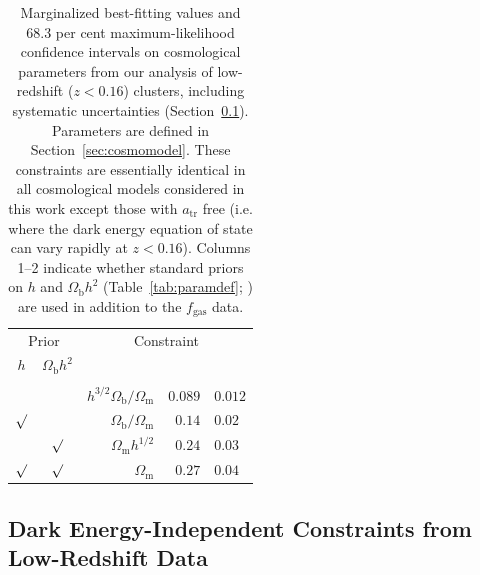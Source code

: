 \documentclass[useAMS,usenatbib,usegraphicx]{mn2e}
\newcommand*{\mysub}[2]{\ensuremath{#1_{\mathrm{#2}}}}
\newcommand*{\Omegam}{\mysub{\Omega}{m}}
\newcommand*{\Omegab}{\mysub{\Omega}{b}}
\newcommand*{\fgas}{\mysub{f}{gas}}
\newcommand*{\atr}{\mysub{a}{tr}}
\newcommand*{\secref}{Section}
\newcommand*{\tabref}{Table}
\begin{document}
\begin{table}
  \begin{center}
    \caption{
      Marginalized best-fitting values and 68.3 per cent maximum-likelihood confidence intervals on cosmological parameters from our analysis of low-redshift ($z<0.16$) clusters, including systematic uncertainties (\secref~\ref{sec:lowz}). Parameters are defined in \secref~\ref{sec:cosmomodel}. These constraints are essentially identical in all cosmological models considered in this work except those with $\atr$ free (i.e. where the dark energy equation of state can vary rapidly at $z<0.16$). Columns 1--2 indicate whether standard priors on $h$ and $\Omegab h^2$ (\tabref~\ref{tab:paramdef}; \citealt{Riess1103.2976, Cooke1308.3240}) are used in addition to the \fgas{} data.
    }
    \label{tab:life}
    \vspace{1ex}
    \begin{tabular}{ccr@{ $=$ }r@{ $\pm$ }l}
      \hline
      \multicolumn{2}{c}{Prior} & \multicolumn{3}{c}{Constraint} \\
      $h$ & $\Omegab h^2$ & \multicolumn{3}{c}{} \\
      \hline\vspace{-1.5ex}\\
      & & $h^{3/2}\Omegab/\Omegam$ & $0.089$ & $0.012$\vspace{1ex}\\
      $\surd$ & & $\Omegab/\Omegam$ & $0.14$ & $0.02$\vspace{1ex}\\
      & $\surd$ & $\Omegam h^{1/2}$ & $0.24$ & $0.03$\vspace{1ex}\\
      $\surd$ & $\surd$ & $\Omegam$ & $0.27$ & $0.04$\vspace{1ex}\\
      \hline
    \end{tabular}
  \end{center}
\end{table}



\subsection{Dark Energy-Independent Constraints from Low-Redshift Data} \label{sec:lowz}
\end{document}

